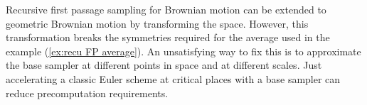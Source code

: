 \documentclass[a4paper,12pt]{article}
\begin{document}
Recursive first passage sampling for Brownian motion can be extended to geometric
Brownian motion by transforming the space. However, this transformation breaks
the symmetries required for the average used in the example (\ref{ex:recu FP average}).
An unsatisfying way to fix this is to approximate the base sampler at different points in
space and at different scales. Just accelerating a classic Euler scheme at critical places
with a base sampler can reduce precomputation requirements.


\newpage
\begin{abstract}
    
\end{abstract}

\printbibliography
\newpage

\end{document}
